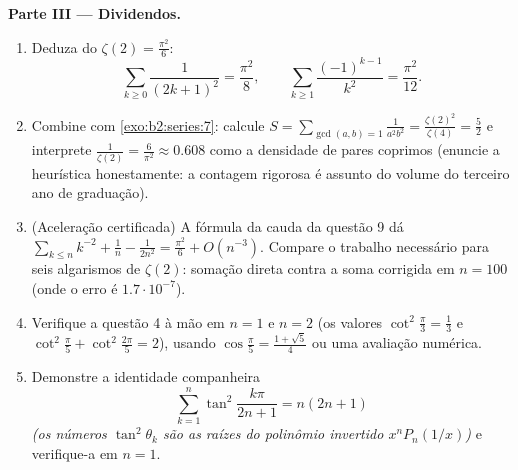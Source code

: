 \begin{problem}[{Problema de fim de semana --- $\zeta(2) = \pi^2/6$ e o
panorama de Bertrand}]
\medskip
\noindent\textbf{Parte III --- Dividendos.}
\begin{enumerate}[resume]
  \item Deduza do $\zeta(2) = \frac{\pi^2}6$:
        \[
        \sum_{k\geq0}\frac{1}{(2k+1)^2} = \frac{\pi^2}{8},
        \qquad
        \sum_{k\geq1}\frac{(-1)^{k-1}}{k^2} = \frac{\pi^2}{12}.
        \]
  \item Combine com \cref{exo:b2:series:7}: calcule $S =
        \sum_{\gcd(a,b)=1}\frac{1}{a^2b^2} =
        \frac{\zeta(2)^2}{\zeta(4)} = \frac52$ e interprete
        $\frac{1}{\zeta(2)} = \frac{6}{\pi^2} \approx 0.608$ como
        a densidade de pares coprimos (enuncie a heurística
        honestamente: a contagem rigorosa é assunto do volume do
        terceiro ano de graduação).
  \item (Aceleração certificada) A fórmula da cauda da questão 9
        dá $\sum_{k\leq n}k^{-2} + \frac1n - \frac1{2n^2} =
        \frac{\pi^2}6 + O(n^{-3})$. Compare o trabalho necessário para
        seis algarismos de $\zeta(2)$: somação direta contra a
        soma corrigida em $n = 100$ (onde o erro é
        $1.7\cdot10^{-7}$).
  \item Verifique a questão 4 à mão em $n = 1$ e $n = 2$ (os
        valores $\cot^2\frac\pi3 = \frac13$ e
        $\cot^2\frac\pi5 + \cot^2\frac{2\pi}5 = 2$), usando
        $\cos\frac\pi5 = \frac{1+\sqrt5}4$ ou uma avaliação
        numérica.
  \item Demonstre a identidade companheira
        \[
        \sum_{k=1}^{n}\tan^2\frac{k\pi}{2n+1} = n(2n+1)
        \]
        \emph{(os números $\tan^2\theta_k$ são as raízes do
        polinômio invertido $x^nP_n(1/x)$)} e verifique-a em $n
        = 1$.
\end{enumerate}


\end{problem}
